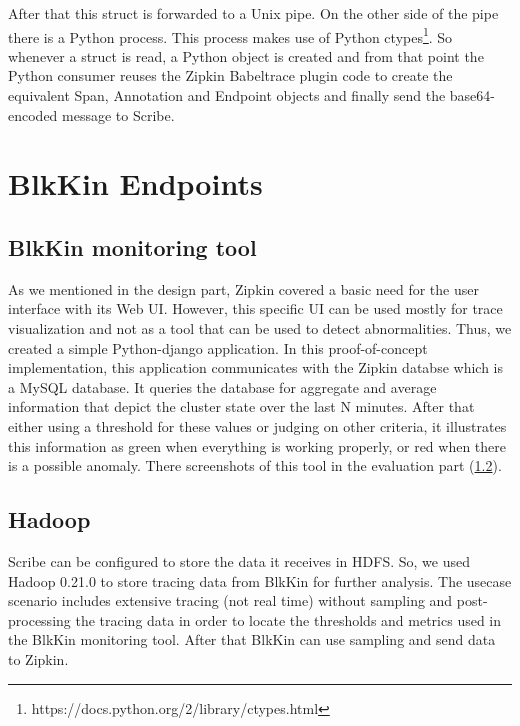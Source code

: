 
After that this struct is forwarded to a Unix pipe. On the other side of the
pipe there is a Python process. This process makes use of Python
ctypes\footnote{https://docs.python.org/2/library/ctypes.html}. So whenever a
struct is read, a Python object is created and from that point the Python
consumer reuses the Zipkin Babeltrace plugin code to create the equivalent Span,
Annotation and Endpoint objects and finally send the base64-encoded message to
Scribe.

\section{BlkKin Endpoints}

\subsection{BlkKin monitoring tool}
As we mentioned in the design part, Zipkin covered a basic need for the user
interface with its Web UI. However, this specific UI can be used mostly for
trace visualization and not as a tool that can be used to detect abnormalities.
Thus, we created a simple Python-django application. In this proof-of-concept
implementation, this application communicates with the Zipkin databse which is a
MySQL database. It queries the database for aggregate and average information
that depict the cluster state over the last N minutes. After that either using a
threshold for these values or judging on other criteria, it illustrates this
information as green when everything is working properly, or red when there is a
possible anomaly. There screenshots of this tool in the evaluation part
(\ref{}).

\subsection{Hadoop}
Scribe can be configured to store the data it receives in HDFS. So, we used
Hadoop 0.21.0 to store tracing data from BlkKin for further analysis. The
usecase scenario includes extensive tracing (not real time) without sampling and
post-processing the tracing data in order to locate the thresholds and metrics
used in the BlkKin monitoring tool. After that BlkKin can use sampling and send
data to Zipkin.


